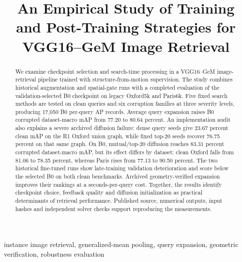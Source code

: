 \documentclass[conference]{IEEEtran}
\begin{document}
\title{An Empirical Study of Training and Post-Training Strategies for VGG16--GeM Image Retrieval}
\author{}
\maketitle
\begin{abstract}
We examine checkpoint selection and search-time processing in a VGG16--GeM image-retrieval pipeline trained with structure-from-motion supervision. The study combines historical augmentation and spatial-gate runs with a completed evaluation of the validation-selected B0 checkpoint on legacy Oxford5k and Paris6k. Five fixed search methods are tested on clean queries and six corruption families at three severity levels, producing 17,050 B0 per-query AP records. Average query expansion raises B0 corrupted dataset-macro mAP from 77.20 to 80.64 percent. An implementation audit also explains a severe archived diffusion failure: dense query seeds give 23.67 percent clean mAP on the R1 Oxford union graph, while fixed top-20 seeds recover 76.75 percent on that same graph. On B0, mutual/top-20 diffusion reaches 83.31 percent corrupted dataset-macro mAP, but its effect differs by dataset: clean Oxford falls from 81.06 to 78.35 percent, whereas Paris rises from 77.13 to 90.50 percent. The two historical fine-tuned runs show late-training validation deterioration and score below the selected B0 on both clean benchmarks. Archived geometry-verified expansion improves their rankings at a seconds-per-query cost. Together, the results identify checkpoint choice, feedback quality and diffusion initialization as practical determinants of retrieval performance. Published source, numerical outputs, input hashes and independent solver checks support reproducing the measurements.
\end{abstract}
\begin{IEEEkeywords}
instance image retrieval, generalized-mean pooling, query expansion, geometric verification, robustness evaluation
\end{IEEEkeywords}








\end{document}
